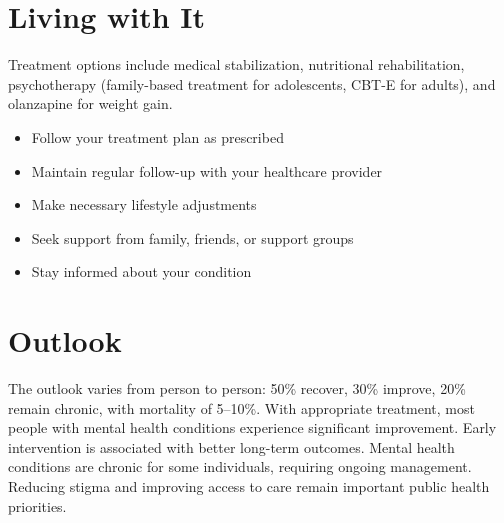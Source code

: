 \section{Living with It}
Treatment options include medical stabilization, nutritional rehabilitation, psychotherapy (family-based treatment for adolescents, CBT-E for adults), and olanzapine for weight gain.

\begin{itemize}[noitemsep]
  \item Follow your treatment plan as prescribed
  \item Maintain regular follow-up with your healthcare provider
  \item Make necessary lifestyle adjustments
  \item Seek support from family, friends, or support groups
  \item Stay informed about your condition
\end{itemize}
\section{Outlook}
The outlook varies from person to person: 50\% recover, 30\% improve, 20\% remain chronic, with mortality of 5--10\%. With appropriate treatment, most people with mental health conditions experience significant improvement. Early intervention is associated with better long-term outcomes. Mental health conditions are chronic for some individuals, requiring ongoing management. Reducing stigma and improving access to care remain important public health priorities.
